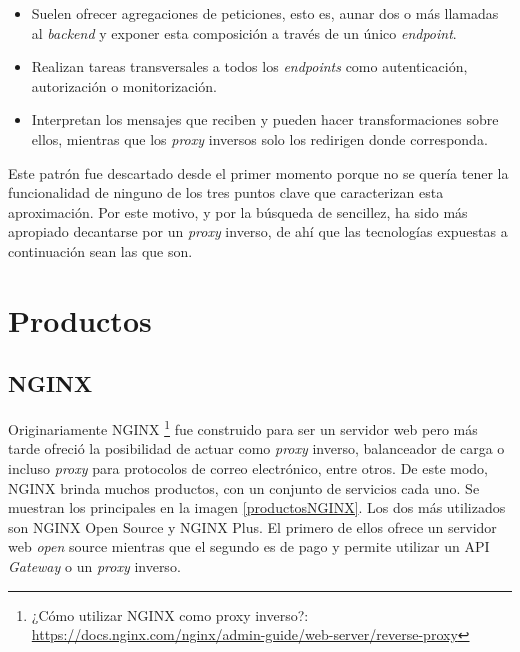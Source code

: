 \documentclass[11pt,spanish,listoffigures]{tfgetsinf}
\begin{document}
\begin{itemize}
	
	\item Suelen ofrecer agregaciones de peticiones, esto es, aunar dos o más llamadas al \emph{backend} y exponer esta composición a través de un único \emph{endpoint}.
	
	\item Realizan tareas transversales a todos los \emph{endpoints} como autenticación, autorización o monitorización.

	\item Interpretan los mensajes que reciben y pueden hacer transformaciones sobre ellos, mientras que los \emph{proxy} inversos solo los redirigen donde corresponda.

\end{itemize}

Este patrón fue descartado desde el primer momento porque no se quería tener la funcionalidad de ninguno de los tres puntos clave que caracterizan esta aproximación. Por este motivo, y por la búsqueda de sencillez, ha sido más apropiado decantarse por un \emph{proxy} inverso, de ahí que las tecnologías expuestas a continuación sean las que son.


	\section{Productos}


		\subsection{NGINX}

Originariamente NGINX \footnote{¿Cómo utilizar NGINX como proxy inverso?: \url{https://docs.nginx.com/nginx/admin-guide/web-server/reverse-proxy}} fue construido para ser un servidor web pero más tarde ofreció la posibilidad de actuar como \emph{proxy} inverso, balanceador de carga o incluso \emph{proxy} para protocolos de correo electrónico, entre otros. De este modo, NGINX brinda muchos productos, con un conjunto de servicios cada uno. Se muestran los principales en la imagen \ref{productosNGINX}. Los dos más utilizados son NGINX Open Source y NGINX Plus. El primero de ellos ofrece un servidor web \emph{open} source mientras que el segundo es de pago y permite utilizar un API \emph{Gateway} o un \emph{proxy} inverso.
\end{document}
